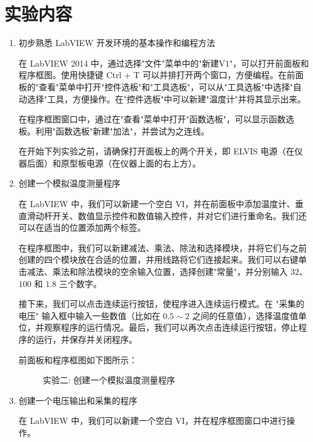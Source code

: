 \documentclass[11pt]{article}
\begin{document}
\section{实验内容}

\begin{enumerate}

\item 初步熟悉 LabVIEW 开发环境的基本操作和编程方法
  
在 LabVIEW 2014 中，通过选择"文件"菜单中的"新建V1"，可以打开前面板和程序框图。使用快捷键 Ctrl + T 可以并排打开两个窗口，方便编程。在前面板的"查看"菜单中打开"控件选板"和"工具选板"，可以从"工具选板"中选择"自动选择"工具，方便操作。在"控件选板"中可以新建"温度计"并将其显示出来。
  
在程序框图窗口中，通过在"查看"菜单中打开"函数选板"，可以显示函数选板。利用"函数选板"新建"加法"，并尝试为之连线。
  
在开始下列实验之前，请确保打开面板上的两个开关，即 ELVIS 电源（在仪器后面）和原型板电源（在仪器上面的右上方）。

\item 创建一个模拟温度测量程序
  
在 LabVIEW 中，我们可以新建一个空白 VI，并在前面板中添加温度计、垂直滑动杆开关、数值显示控件和数值输入控件，并对它们进行重命名。我们还可以在适当的位置添加两个标签。
  
在程序框图中，我们可以新建减法、乘法、除法和选择模块，并将它们与之前创建的四个模块放在合适的位置，并用线路将它们连接起来。我们可以右键单击减法、乘法和除法模块的空余输入位置，选择创建"常量"，并分别输入 $32$、$100$ 和 $1.8$ 三个数字。
  
接下来，我们可以点击连续运行按钮，使程序进入连续运行模式。在 "采集的电压" 输入框中输入一些数值（比如在 $0.5 \sim 2$ 之间的任意值），选择温度值单位，并观察程序的运行情况。最后，我们可以再次点击连续运行按钮，停止程序的运行，并保存并关闭程序。
  
前面板和程序框图如下图所示：
  
\begin{figure}[H]
    \centering
    \hspace{0.5cm}
    \caption{实验二: 创建一个模拟温度测量程序}
\end{figure}

  
\item 创建一个电压输出和采集的程序
  
在 LabVIEW 中，我们可以新建一个空白 VI，并在程序框图窗口中进行操作。
  

\end{enumerate}
\end{document}
